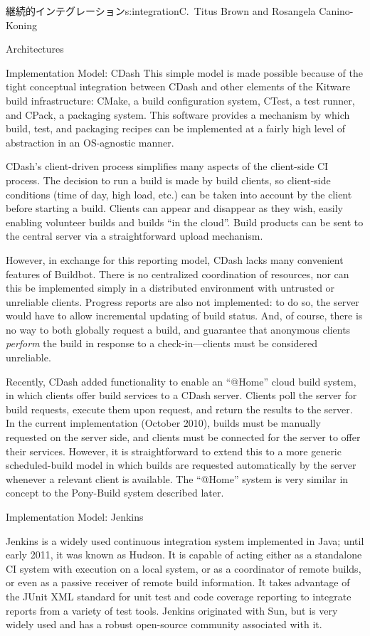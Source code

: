 \begin{aosachapter}{継続的インテグレーション}{s:integration}{C.\ Titus Brown and Rosangela Canino-Koning}
\begin{aosasect1}{Architectures}
\begin{aosasect2}{Implementation Model: CDash}
This simple model is made possible because of the tight conceptual
integration between CDash and other elements of the Kitware build
infrastructure: CMake, a build configuration system, CTest, a test
runner, and CPack, a packaging system. This software provides a
mechanism by which build, test, and packaging recipes can be
implemented at a fairly high level of abstraction in an OS-agnostic
manner.

CDash's client-driven process simplifies many aspects of the
client-side CI process. The decision to run a build is made by build
clients, so client-side conditions (time of day, high load, etc.) can
be taken into account by the client before starting a build. Clients
can appear and disappear as they wish, easily enabling volunteer
builds and builds ``in the cloud''. Build products can be sent to the
central server via a straightforward upload mechanism.

However, in exchange for this reporting model, CDash lacks many
convenient features of Buildbot. There is no centralized coordination
of resources, nor can this be implemented simply in a distributed
environment with untrusted or unreliable clients. Progress reports are
also not implemented: to do so, the server would have to allow
incremental updating of build status. And, of course, there is no way
to both globally request a build, and guarantee that anonymous clients
\emph{perform} the build in response to a check-in---clients must be
considered unreliable.

Recently, CDash added functionality to enable an ``@Home'' cloud build
system, in which clients offer build services to a CDash server.
Clients poll the server for build requests, execute them upon request,
and return the results to the server.  In the current implementation
(October 2010), builds must be manually requested on the server side,
and clients must be connected for the server to offer their services.
However, it is straightforward to extend this to a more generic
scheduled-build model in which builds are requested automatically by
the server whenever a relevant client is available.  The ``@Home''
system is very similar in concept to the Pony-Build system described
later.

\end{aosasect2}

\begin{aosasect2}{Implementation Model: Jenkins}

Jenkins is a widely used continuous integration system implemented in
Java; until early 2011, it was known as Hudson. It is capable of
acting either as a standalone CI system with execution on a local
system, or as a coordinator of remote builds, or even as a passive
receiver of remote build information. It takes advantage of the JUnit
XML standard for unit test and code coverage reporting to integrate
reports from a variety of test tools. Jenkins originated with Sun, but
is very widely used and has a robust open-source community associated
with it.


\end{aosasect2}
\end{aosasect1}
\end{aosachapter}
